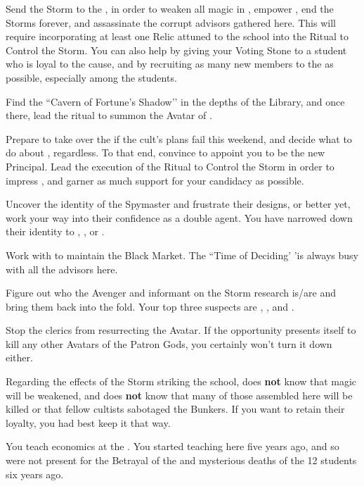 \documentclass[char]{GL2020}
\begin{document}
\begin{itemz}
    \item Send the Storm to the \pSc{}, in order to weaken all magic in \pEarth{}, empower \cGenesis{}, end the Storms forever, and assassinate the corrupt advisors gathered here. This will require incorporating at least one Relic attuned to the school into the Ritual to Control the Storm. You can also help by giving your Voting Stone to a student who is loyal to the cause, and by recruiting as many new members to the \pGoaties{} as possible, especially among the students. 
    \item Find the ``Cavern of Fortune’s Shadow’’ in the depths of the Library, and once there, lead the ritual to summon the Avatar of \cGenesis{}. 
    \item Prepare to take over the \pGoaties{} if the cult’s plans fail this weekend, and decide what to do about \cChupLeader{}, regardless. To that end, convince \cPrincipal{} to appoint you to be the new Principal. Lead the execution of the Ritual to Control the Storm in order to impress \cPrincipal{\them}, and garner as much support for your candidacy as possible.
    \item Uncover the identity of the \pShippie{} Spymaster and frustrate their designs, or better yet, work your way into their confidence as a double agent. You have narrowed down their identity to \cJuniorStatesman{}, \cBunker{}, or \cEbbPriest{}.
    \item Work with \cChupInventor{} to maintain the Black Market. The ``Time of Deciding’ ’is always busy with all the advisors here.
    \item Figure out who the Avenger and informant on the Storm research is/are and bring them back into the fold. Your top three suspects are \cInterpol{}, \cChupAvenger{}, and \cWildCard{}.
    \item Stop the \pShip{} clerics from resurrecting the \cEbb{} Avatar. If the opportunity presents itself to kill any other Avatars of the Patron Gods, you certainly won't turn it down either. 
\end{itemz}

\begin{itemz}[Notes]
    \item Regarding the effects of the Storm striking the school, \cChupInventor{} does \textbf{not} know that magic will be weakened, and \cChupStudent{} does \textbf{not} know that many of those assembled here will be killed or that \cChupStudent{\their} fellow cultists sabotaged the Bunkers. If you want to retain their loyalty, you had best keep it that way.
    \item You teach economics at the \pSchool{}. You started teaching here five years ago, and so were not present for the Betrayal of the \pShip{} and mysterious deaths of the 12 students six years ago.
\end{itemz}
\end{document}
